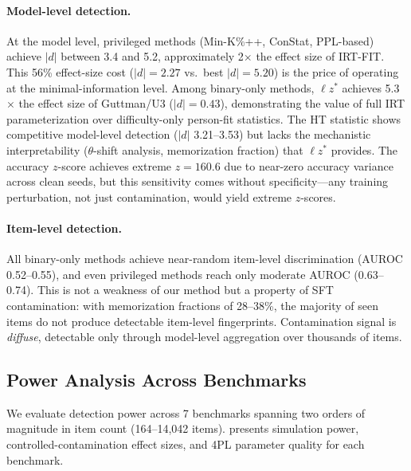 \documentclass[11pt,a4paper]{article}
\begin{document}
\paragraph{Model-level detection.}
At the model level, privileged methods (Min-K\%++, ConStat, PPL-based) achieve $|d|$ between 3.4 and 5.2, approximately 2$\times$ the effect size of \textsc{IRT-FIT}.
This 56\% effect-size cost ($|d|{=}2.27$ vs.\ best $|d|{=}5.20$) is the price of operating at the minimal-information level.
Among binary-only methods, $\ell z^*$ achieves 5.3$\times$ the effect size of Guttman/U3 ($|d|{=}0.43$), demonstrating the value of full IRT parameterization over difficulty-only person-fit statistics.
The HT statistic shows competitive model-level detection ($|d|$ 3.21--3.53) but lacks the mechanistic interpretability ($\theta$-shift analysis, memorization fraction) that $\ell z^*$ provides.
The accuracy $z$-score achieves extreme $z{=}160.6$ due to near-zero accuracy variance across clean seeds, but this sensitivity comes without specificity---any training perturbation, not just contamination, would yield extreme $z$-scores.

\paragraph{Item-level detection.}
All binary-only methods achieve near-random item-level discrimination (AUROC 0.52--0.55), and even privileged methods reach only moderate AUROC (0.63--0.74).
This is not a weakness of our method but a property of SFT contamination: with memorization fractions of 28--38\%, the majority of seen items do not produce detectable item-level fingerprints.
Contamination signal is \emph{diffuse}, detectable only through model-level aggregation over thousands of items.

\subsection{Power Analysis Across Benchmarks}
\label{sec:power}

We evaluate detection power across 7 benchmarks spanning two orders of magnitude in item count (164--14,042 items).
 presents simulation power, controlled-contamination effect sizes, and 4PL parameter quality for each benchmark.
\end{document}
